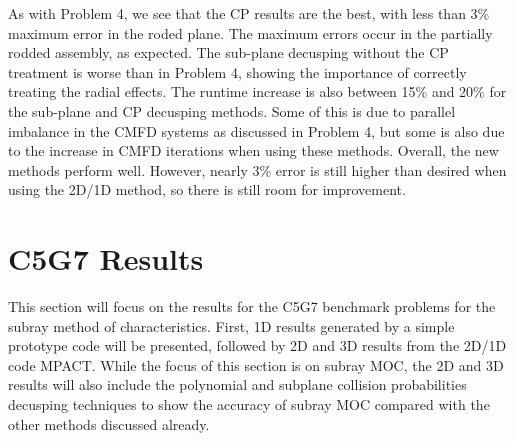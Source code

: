 \begin{table}
\centering
\caption[VERA Problem 5 Decusping Results]{VERA Problem 5 decusping results for the partially rodded plane}\label{t:p5decusp}
\end{table}

As with Problem 4, we see that the CP results are the best, with less than 3\% maximum error in the roded plane.  The maximum errors occur in the partially rodded assembly, as expected.  The sub-plane decusping without the CP treatment is worse than in Problem 4, showing the importance of correctly treating the radial effects.  The runtime increase is also between 15\% and 20\% for the sub-plane and CP decusping methods.  Some of this is due to parallel imbalance in the CMFD systems as discussed in Problem 4, but some is also due to the increase in CMFD iterations when using these methods.  Overall, the new methods perform well.  However, nearly 3\% error is still higher than desired when using the 2D/1D method, so there is still room for improvement.

\section{C5G7 Results}

This section will focus on the results for the C5G7 benchmark problems for the subray method of characteristics.  First, 1D results generated by a simple prototype code will be presented, followed by 2D and 3D results from the 2D/1D code MPACT.  While the focus of this section is on subray MOC, the 2D and 3D results will also include the polynomial and subplane collision probabilities decusping techniques to show the accuracy of subray MOC compared with the other methods discussed already.

